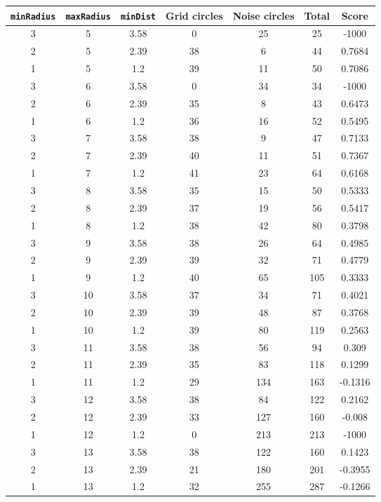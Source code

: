 \documentclass[letterpaper, 12pt]{article}
\begin{document}
\begin{longtable}{|c|c|c|c|c|c|c|}
\hline
\textbf{\texttt{minRadius}} & \textbf{\texttt{maxRadius}} & \textbf{\texttt{minDist}} & \textbf{Grid circles} & \textbf{Noise circles} & \textbf{Total} & \textbf{Score} \\
\hline
3 & 5 & 3.58 & 0 & 25 & 25 & -1000 \\
\hline
2 & 5 & 2.39 & 38 & 6 & 44 & 0.7684 \\
\hline
1 & 5 & 1.2 & 39 & 11 & 50 & 0.7086 \\
\hline
3 & 6 & 3.58 & 0 & 34 & 34 & -1000 \\
\hline
2 & 6 & 2.39 & 35 & 8 & 43 & 0.6473 \\
\hline
1 & 6 & 1.2 & 36 & 16 & 52 & 0.5495 \\
\hline
3 & 7 & 3.58 & 38 & 9 & 47 & 0.7133 \\
\hline
2 & 7 & 2.39 & 40 & 11 & 51 & 0.7367 \\
\hline
1 & 7 & 1.2 & 41 & 23 & 64 & 0.6168 \\
\hline
3 & 8 & 3.58 & 35 & 15 & 50 & 0.5333 \\
\hline
2 & 8 & 2.39 & 37 & 19 & 56 & 0.5417 \\
\hline
1 & 8 & 1.2 & 38 & 42 & 80 & 0.3798 \\
\hline
3 & 9 & 3.58 & 38 & 26 & 64 & 0.4985 \\
\hline
2 & 9 & 2.39 & 39 & 32 & 71 & 0.4779 \\
\hline
1 & 9 & 1.2 & 40 & 65 & 105 & 0.3333 \\
\hline
3 & 10 & 3.58 & 37 & 34 & 71 & 0.4021 \\
\hline
2 & 10 & 2.39 & 39 & 48 & 87 & 0.3768 \\
\hline
1 & 10 & 1.2 & 39 & 80 & 119 & 0.2563 \\
\hline
3 & 11 & 3.58 & 38 & 56 & 94 & 0.309 \\
\hline
2 & 11 & 2.39 & 35 & 83 & 118 & 0.1299 \\
\hline
1 & 11 & 1.2 & 29 & 134 & 163 & -0.1316 \\
\hline
3 & 12 & 3.58 & 38 & 84 & 122 & 0.2162 \\
\hline
2 & 12 & 2.39 & 33 & 127 & 160 & -0.008 \\
\hline
1 & 12 & 1.2 & 0 & 213 & 213 & -1000 \\
\hline
3 & 13 & 3.58 & 38 & 122 & 160 & 0.1423 \\
\hline
2 & 13 & 2.39 & 21 & 180 & 201 & -0.3955 \\
\hline
1 & 13 & 1.2 & 32 & 255 & 287 & -0.1266 \\

\end{longtable}
\end{document}
